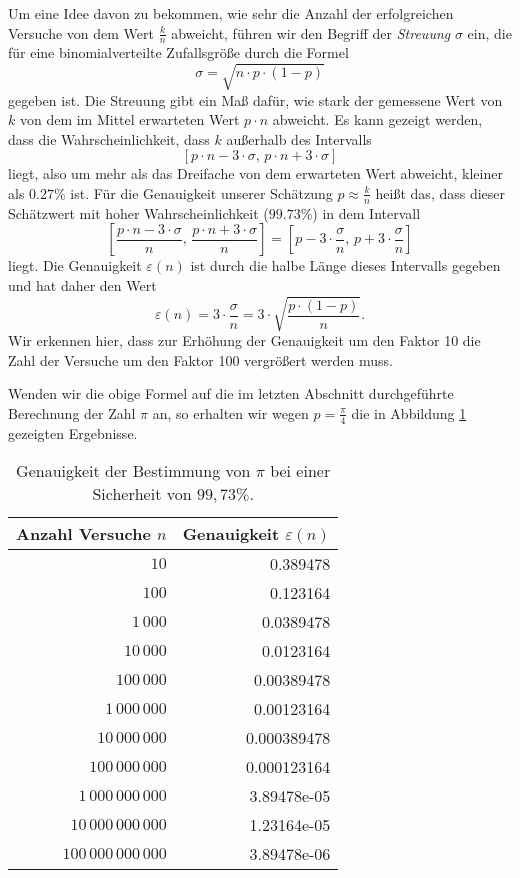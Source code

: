 Um eine Idee davon zu bekommen, wie sehr die Anzahl der erfolgreichen Versuche von dem Wert $\frac{k}{n}$
abweicht,  f\"uhren wir den Begriff der \emph{Streuung} $\sigma$ ein, die f\"ur eine binomialverteilte Zufallsgr\"o{\ss}e
durch die Formel
\[ \sigma = \sqrt{n \cdot p \cdot (1 - p)} \]
gegeben ist.  Die Streuung gibt ein Ma{\ss} daf\"ur, wie stark der gemessene Wert von $k$ von dem im Mittel
erwarteten Wert $p \cdot n$ abweicht.  Es kann gezeigt werden, dass die Wahrscheinlichkeit, dass $k$ au{\ss}erhalb
des Intervalls
\[ [ p \cdot n - 3 \cdot \sigma,\, p \cdot n + 3 \cdot \sigma ] \]
liegt, also um mehr als das Dreifache von dem erwarteten Wert abweicht, kleiner als $0.27 \%$ ist.  F\"ur
 die Genauigkeit unserer Sch\"atzung $p \approx \frac{k}{n}$ hei{\ss}t das, dass dieser Sch\"atzwert mit hoher
 Wahrscheinlichkeit ($99.73\%$) in dem Intervall
\[  \left[ \frac{p \cdot n - 3 \cdot \sigma}{n},\, \frac{p \cdot n + 3 \cdot \sigma}{n} \right] 
  = \left[ p - 3 \cdot \frac{\sigma}{n},\, p + 3 \cdot \frac{\sigma}{n} \right]
\] 
liegt.  Die Genauigkeit $\varepsilon(n)$ ist durch die halbe L\"ange dieses Intervalls gegeben und hat daher den
Wert 
\[ \varepsilon(n) = 3 \cdot \frac{\sigma}{n} = 3 \cdot \sqrt{\frac{p \cdot (1 - p)}{n}}. \]
Wir erkennen hier, dass zur Erh\"ohung der Genauigkeit um den Faktor 10 die Zahl der Versuche um den Faktor 100
vergr\"o{\ss}ert werden muss.

Wenden wir die obige Formel auf die im letzten Abschnitt durchgef\"uhrte Berechnung der Zahl $\pi$ an, so erhalten
wir wegen $p = \frac{\pi}{4}$ die in Abbildung \ref{tab:Precision.java} gezeigten Ergebnisse.

\begin{table}[htbp]
  \centering
  \begin{tabular}[t]{|r|r|}
\hline
Anzahl Versuche $n$ & Genauigkeit $\varepsilon(n)$ \\
\hline
\hline
                $10$ & 0.389478 \\
\hline
               $100$ & 0.123164 \\
\hline
            $1\,000$ & 0.0389478 \\
\hline
           $10\,000$ & 0.0123164 \\
\hline
          $100\,000$ & 0.00389478 \\
\hline
       $1\,000\,000$ & 0.00123164 \\
\hline
      $10\,000\,000$ & 0.000389478 \\
\hline
     $100\,000\,000$ & 0.000123164 \\
\hline
  $1\,000\,000\,000$ & 3.89478e-05 \\
\hline
 $10\,000\,000\,000$ & 1.23164e-05 \\
\hline
$100\,000\,000\,000$ & 3.89478e-06 \\
\hline

  \end{tabular}
  \caption{Genauigkeit der Bestimmung von $\pi$ bei einer Sicherheit von $99,73\%$.}
  \label{tab:Precision.java}
\end{table}

